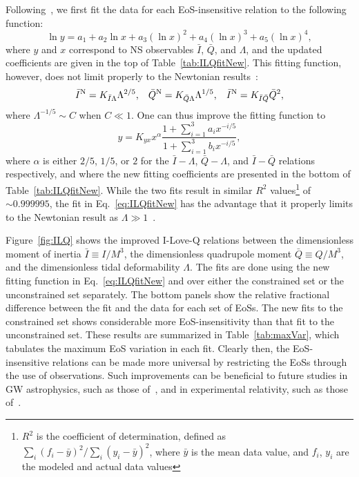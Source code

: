 \documentclass[prd,twocolumn,nofootinbib,superscriptaddress,amsmath,amssymb]{revtex4-1}
\begin{document}
Following~\cite{Yagi:ILQ}, we first fit the data for each EoS-insensitive relation to the following function:
\begin{equation}\label{eq:ILQfit}
\ln{y}=a_{1}+a_{2} \ln{x} + a_{3} (\ln{x})^2 + a_{4} (\ln{x})^3 + a_{5} (\ln{x})^4,
\end{equation}
where $y$ and $x$ correspond to NS observables $\bar{I}$, $\bar{Q}$, and $\Lambda$, and the updated coefficients are given in the top of Table~\ref{tab:ILQfitNew}. This fitting function, however, does not limit properly to the Newtonian results~\cite{Yagi:ILQ}:
\begin{equation}\label{eq:Newtonian}
\bar{I}^{\text{N}} = K_{\bar{I}\Lambda}\Lambda^{2/5}, \hspace{3mm} \bar{Q}^{\text{N}} = K_{\bar{Q}\Lambda}\Lambda^{1/5}, \hspace{3mm} \bar{I}^{\text{N}} = K_{\bar{I}\bar{Q}}\bar{Q}^{2},
\end{equation}
where $\Lambda^{-1/5} \sim C$ when $C \ll 1$. One can thus improve the fitting function to 
\begin{equation}\label{eq:ILQfitNew}
y=K_{yx} x^{\alpha} \frac{1+\sum_{i=1}^3 a_i x^{-i/5}}{1+\sum_{i=1}^3 b_i x^{-i/5}},
\end{equation}
where $\alpha$ is either $2/5$, $1/5$, or $2$ for the $\bar{I}-\Lambda$, $\bar{Q}-\Lambda$, and $\bar{I}-\bar{Q}$ relations respectively, and where the new fitting coefficients are presented in the bottom of Table~\ref{tab:ILQfitNew}. While the two fits result in similar $R^2$ values\footnote{$R^2$ is the coefficient of determination, defined as $\sum_i(f_i-\bar{y})^2/\sum_i(y_i-\bar{y})^2$, where $\bar{y}$ is the mean data value, and $f_i$, $y_i$ are the modeled and actual data values} of $\sim 0.999995$, the fit in Eq.~\eqref{eq:ILQfitNew} has the advantage that it properly limits to the Newtonian result as $\Lambda \gg 1$~\cite{Yagi:binLove}.

Figure~\ref{fig:ILQ} shows the improved I-Love-Q relations between the dimensionless moment of inertia $\bar{I} \equiv I/M^3$, the dimensionless quadrupole moment $\bar{Q} \equiv Q/M^3$, and the dimensionless tidal deformability $\Lambda$. The fits are done using the new fitting function in Eq.~\eqref{eq:ILQfitNew} and over either the constrained set or the unconstrained set separately. The bottom panels show the relative fractional difference between the fit and the data for each set of EoSs. The new fits to the constrained set shows considerable more EoS-insensitivity than that fit to the unconstrained set. These results are summarized in Table~\ref{tab:maxVar}, which tabulates the maximum EoS variation in each fit. Clearly then, the EoS-insensitive relations can be made more universal by restricting the EoSs through the use of observations. Such improvements can be beneficial to future studies in GW astrophysics, such as those of~\cite{Kumar:2019xgp}, and in experimental relativity, such as those of~\cite{Gupta:2017vsl}. 
\end{document}

